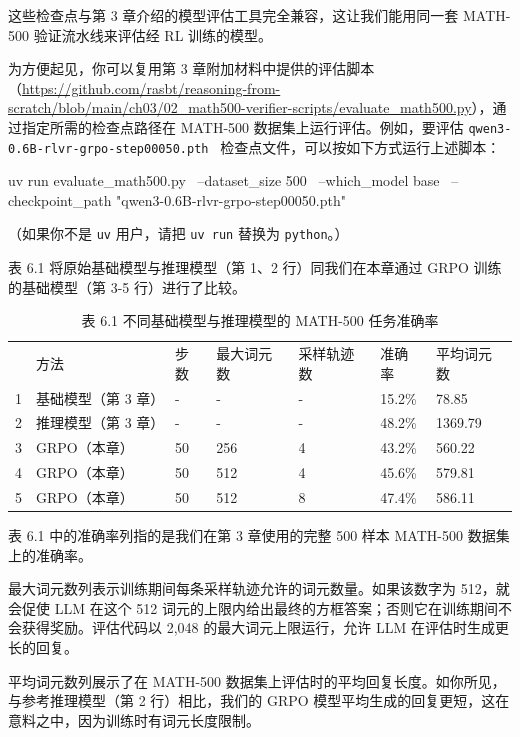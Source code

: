这些检查点与第 3 章介绍的模型评估工具完全兼容，这让我们能用同一套 MATH-500 验证流水线来评估经 RL 训练的模型。

为方便起见，你可以复用第 3 章附加材料中提供的评估脚本（\href{https://github.com/rasbt/reasoning-from-scratch/blob/main/ch03/02\_math500-verifier-scripts/evaluate\_math500.py}{https://github.com/rasbt/reasoning-from-scratch/blob/main/ch03/02\_math500-verifier-scripts/evaluate\_math500.py}），通过指定所需的检查点路径在 MATH-500 数据集上运行评估。例如，要评估 \texttt{qwen3-0.6B-rlvr-grpo-step00050.pth } 检查点文件，可以按如下方式运行上述脚本：

\begin{codebox}
uv run evaluate_math500.py \
--dataset_size 500 \
--which_model base \
--checkpoint_path "qwen3-0.6B-rlvr-grpo-step00050.pth"
\end{codebox}

（如果你不是 \texttt{uv} 用户，请把 \texttt{uv run} 替换为 \texttt{python}。）

表 6.1 将原始基础模型与推理模型（第 1、2 行）同我们在本章通过 GRPO 训练的基础模型（第 3-5 行）进行了比较。

\begin{table}[htbp]
\centering\small
\centering
\caption{表 6.1 不同基础模型与推理模型的 MATH-500 任务准确率}
\begin{tabularx}{\linewidth}{@{}c@{}XXXXXX}
\toprule
 & 方法 & 步数 & 最大词元数 & 采样轨迹数 & 准确率 & 平均词元数 \\
1 & 基础模型（第 3 章） & - & - & - & 15.2\% & 78.85 \\
2 & 推理模型（第 3 章） & - & - & - & 48.2\% & 1369.79 \\
3 & GRPO（本章） & 50 & 256 & 4 & 43.2\% & 560.22 \\
4 & GRPO（本章） & 50 & 512 & 4 & 45.6\% & 579.81 \\
5 & GRPO（本章） & 50 & 512 & 8 & 47.4\% & 586.11 \\ \bottomrule
\end{tabularx}
\end{table}

表 6.1 中的准确率列指的是我们在第 3 章使用的完整 500 样本 MATH-500 数据集上的准确率。

最大词元数列表示训练期间每条采样轨迹允许的词元数量。如果该数字为 512，就会促使 LLM 在这个 512 词元的上限内给出最终的方框答案；否则它在训练期间不会获得奖励。评估代码以 2,048 的最大词元上限运行，允许 LLM 在评估时生成更长的回复。

平均词元数列展示了在 MATH-500 数据集上评估时的平均回复长度。如你所见，与参考推理模型（第 2 行）相比，我们的 GRPO 模型平均生成的回复更短，这在意料之中，因为训练时有词元长度限制。

